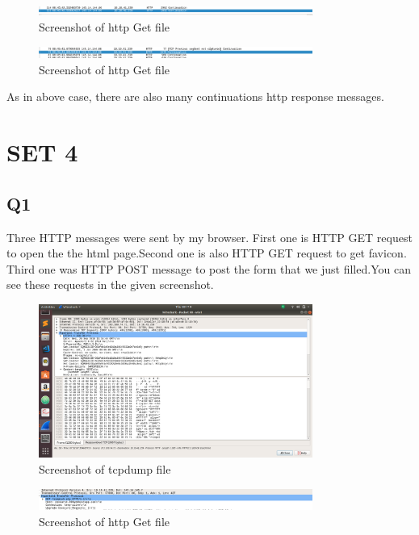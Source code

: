\documentclass{article}
\begin{document}
  \begin{figure}[H]
 \centering
 \includegraphics[width=0.8\textwidth]{../Set3/q4/a1.png}
 \caption{\label{fig:PING}Screenshot of http Get file}
 \end{figure}
 
   \begin{figure}[H]
 \centering
 \includegraphics[width=0.8\textwidth]{../Set3/q4/a2.png}
 \caption{\label{fig:PING}Screenshot of http Get file}
 \end{figure}
 
 As in above case, there are also many continuations http response messages.\\
\section{SET 4}

\subsection{Q1}
Three HTTP messages were sent by my browser. First one is HTTP GET request
to open the the html page.Second one is also HTTP GET request to get favicon. Third one was HTTP POST message to post the form that we just filled.You can see these requests in the given screenshot.\\

 \begin{figure}[H]
 \centering
 \includegraphics[width=0.8\textwidth]{../Set5/q1/a.png}
 \caption{\label{fig:PING}Screenshot of tcpdump file}
 \end{figure}
 
  \begin{figure}[H]
 \centering
 \includegraphics[width=0.8\textwidth]{../Set4/a.png}
 \caption{\label{fig:PING}Screenshot of http Get file}
 \end{figure}
 
\end{document}

